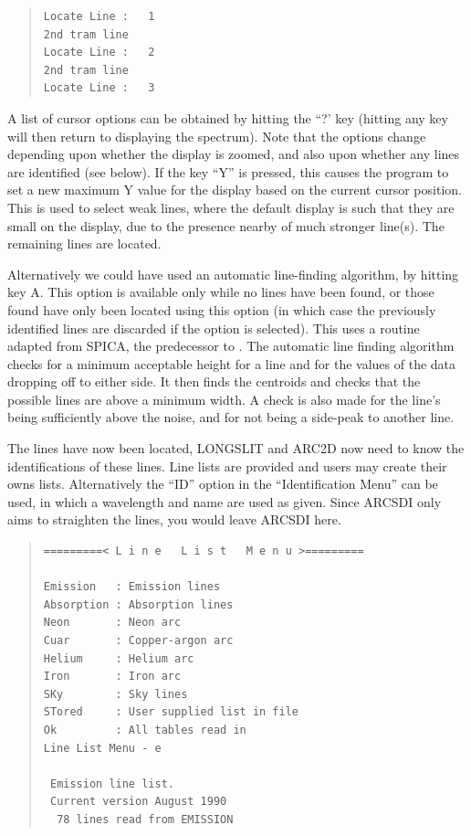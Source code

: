 \begin{quote}\begin{verbatim}
Locate Line :   1
2nd tram line
Locate Line :   2
2nd tram line
Locate Line :   3
\end{verbatim}\end{quote}

A list of cursor options can be obtained by hitting the ``?' key (hitting
any key will then return to displaying the spectrum).
Note that the options change depending upon whether the display is
zoomed, and also upon whether any lines are identified (see below).
If the key ``Y'' is pressed, this causes the program to set a new
maximum Y value for the display based on the current cursor position.
This is used to select weak lines, where the default display is such
that they are small on the display, due to the presence nearby of much
stronger line(s).
The remaining lines are located.

Alternatively we could have used an automatic line-finding algorithm,
by hitting key A. This option is available only while no lines have
been found, or those found have only been located using this option (in
which case the previously identified lines are discarded if the option
is selected).  This uses a routine adapted from SPICA, the predecessor
to .  The automatic line finding algorithm checks
for a minimum acceptable height for a line and for the values of the
data dropping off to either side. It then finds the centroids and
checks that the possible lines are above a minimum width. A check is
also made for the line's being sufficiently above the noise, and for
not being a side-peak to another line.

The lines have now been located, LONGSLIT and ARC2D now need to know the
identifications of these lines.
Line lists are provided and users may create their owns lists.
Alternatively the ``ID'' option in the ``Identification Menu'' can be
used, in which a wavelength and name are used as given.
Since ARCSDI only aims to straighten the lines, you would leave ARCSDI
here.
 
\begin{quote}\begin{verbatim}
=========< L i n e   L i s t   M e n u >=========
 
Emission   : Emission lines
Absorption : Absorption lines
Neon       : Neon arc
Cuar       : Copper-argon arc
Helium     : Helium arc
Iron       : Iron arc
SKy        : Sky lines
STored     : User supplied list in file
Ok         : All tables read in
Line List Menu - e
 
 Emission line list.
 Current version August 1990
  78 lines read from EMISSION
\end{verbatim}\end{quote}

